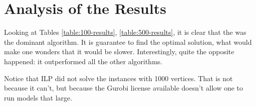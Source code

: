 \section{Analysis of the Results}

Looking at Tables \ref{table:100-results}, \ref{table:500-results}, it is clear that the  was the dominant algorithm. It is guarantee to find the optimal solution, what would make one wonders that it would be slower. Interestingly, quite the opposite happened: it outperformed all the other algorithms.

Notice that ILP did not solve the instances with 1000 vertices. That is not because it can't, but because the Gurobi license available doesn't allow one to run models that large.
